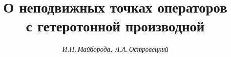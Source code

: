 

 




\newcommand{\la}{\langle} 


\newcommand{\ra}{\rangle} 


\newcommand{\tts}[1]{} 


\renewcommand{\baselinestretch}{0.96}


 




\setcounter{page}{53} 












 


\author{\it И.Н.\,Майборода, Л.А.\,Островецкий} 




\title{О неподвижных точках операторов \\ 


с гетеротонной производной} 


 


\date{} 




\pagestyle{plain} %


 




\maketitle 


